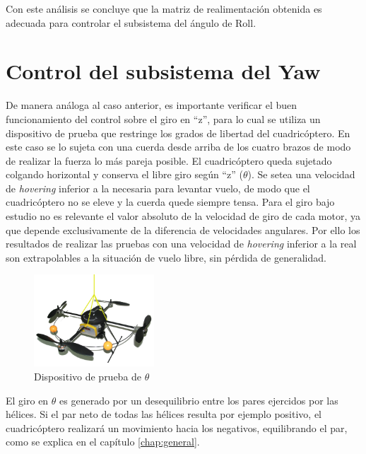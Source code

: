 \documentclass[main]{subfiles}
\begin{document}
Con este an\'alisis se concluye que la matriz de realimentaci\'on obtenida es adecuada para controlar el subsistema del \'angulo de Roll.

\section{Control del subsistema del Yaw}

De manera an\'aloga al caso anterior, es importante verificar el buen funcionamiento del control sobre el giro en ``z'', para lo cual se utiliza un dispositivo de prueba que restringe los grados de libertad del cuadric\'optero. En este caso se lo sujeta con una cuerda desde arriba de los cuatro brazos de modo de realizar la fuerza lo m\'as pareja posible. El cuadric\'optero queda sujetado colgando horizontal y conserva el libre giro seg\'un ``z'' ($\theta$).
Se setea una velocidad de \emph{hovering} inferior a la necesaria para levantar vuelo, de modo que el cuadric\'optero no se eleve y la cuerda quede siempre tensa. Para el giro bajo estudio no es relevante el valor absoluto de la velocidad de giro de cada motor, ya que depende exclusivamente de la diferencia de velocidades angulares. Por ello los resultados de realizar las pruebas con una velocidad de \emph{hovering} inferior a la real son extrapolables a la situaci\'on de vuelo libre, sin p\'erdida de generalidad.\\

\begin{figure}
	\vspace{-20pt}
	\centering
	\includegraphics[width=0.4\textwidth]{./pics_test_control/dispositivo_theta.pdf}
	\caption{Dispositivo de prueba de $\theta$}
	\label{fig:thetadisp}
\end{figure}

El giro en $\theta$ es generado por un desequilibrio entre los pares ejercidos por las h\'elices. Si el par neto de todas las h\'elices resulta por ejemplo positivo, el cuadric\'optero realizar\'a un movimiento hacia los negativos, equilibrando el par, como se explica en el cap\'itulo \ref{chap:general}.\\
\end{document}
